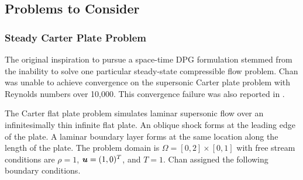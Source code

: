 \documentclass[Proposal.tex]{subfiles}
\begin{document}
\subsection{Problems to Consider}
\subsubsection{Steady Carter Plate Problem}
The original inspiration to pursue a space-time DPG formulation stemmed from the inability to solve one particular steady-state compressible flow problem.
Chan\cite{JesseDissertation} was unable to achieve convergence on the supersonic Carter plate problem\cite{Carter1973} with Reynolds numbers over 10,000.
This convergence failure was also reported in \cite{KirkDissertation}.

The Carter flat plate problem simulates laminar supersonic flow over an infinitesimally thin infinite flat plate.
An oblique shock forms at the leading edge of the plate. 
A laminar boundary layer forms at the same location along the length of the plate.
The problem domain is $\Omega=[0,2]\times[0,1]$
with free stream conditions are $\rho=1$, $\boldsymbol u=(1,0)^T$, and $T=1$.
Chan assigned the following boundary conditions.
\end{document}
